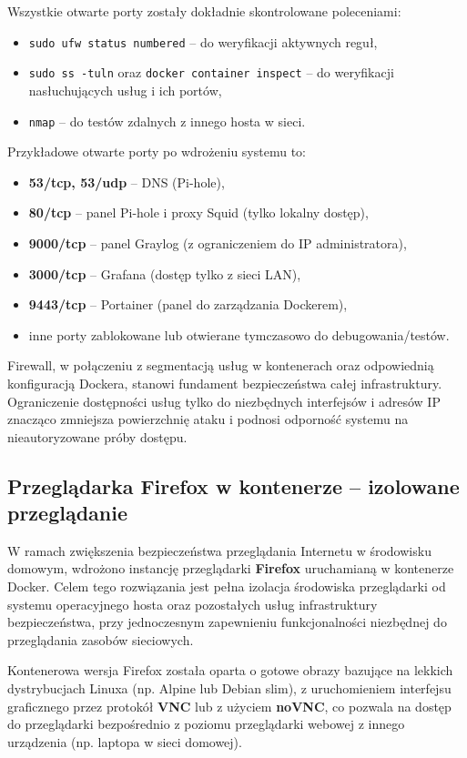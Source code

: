 \documentclass[
    left=2.5cm,         %
    right=2.5cm,        %
    top=2.5cm,          %
    bottom=3cm,         %
    bindingoffset=6mm,  %
    nohyphenation=true %
]{eiti/eiti-thesis} %
\begin{document}
Wszystkie otwarte porty zostały dokładnie skontrolowane poleceniami:
\begin{itemize}
    \item \texttt{sudo ufw status numbered} – do weryfikacji aktywnych reguł,
    \item \texttt{sudo ss -tuln} oraz \texttt{docker container inspect} – do weryfikacji nasłuchujących usług i ich portów,
    \item \texttt{nmap} – do testów zdalnych z innego hosta w sieci.
\end{itemize}

Przykładowe otwarte porty po wdrożeniu systemu to:
\begin{itemize}
    \item \textbf{53/tcp, 53/udp} – DNS (Pi-hole),
    \item \textbf{80/tcp} – panel Pi-hole i proxy Squid (tylko lokalny dostęp),
    \item \textbf{9000/tcp} – panel Graylog (z ograniczeniem do IP administratora),
    \item \textbf{3000/tcp} – Grafana (dostęp tylko z sieci LAN),
    \item \textbf{9443/tcp} – Portainer (panel do zarządzania Dockerem),
    \item inne porty zablokowane lub otwierane tymczasowo do debugowania/testów.
\end{itemize}

Firewall, w połączeniu z segmentacją usług w kontenerach oraz odpowiednią konfiguracją Dockera, stanowi fundament bezpieczeństwa całej infrastruktury. Ograniczenie dostępności usług tylko do niezbędnych interfejsów i adresów IP znacząco zmniejsza powierzchnię ataku i podnosi odporność systemu na nieautoryzowane próby dostępu.

\subsection{Przeglądarka Firefox w kontenerze – izolowane przeglądanie}

W ramach zwiększenia bezpieczeństwa przeglądania Internetu w środowisku domowym, wdrożono instancję przeglądarki \textbf{Firefox} uruchamianą w kontenerze Docker. Celem tego rozwiązania jest pełna izolacja środowiska przeglądarki od systemu operacyjnego hosta oraz pozostałych usług infrastruktury bezpieczeństwa, przy jednoczesnym zapewnieniu funkcjonalności niezbędnej do przeglądania zasobów sieciowych.

Kontenerowa wersja Firefox została oparta o gotowe obrazy bazujące na lekkich dystrybucjach Linuxa (np. Alpine lub Debian slim), z uruchomieniem interfejsu graficznego przez protokół \textbf{VNC} lub z użyciem \textbf{noVNC}, co pozwala na dostęp do przeglądarki bezpośrednio z poziomu przeglądarki webowej z innego urządzenia (np. laptopa w sieci domowej).
\end{document}
